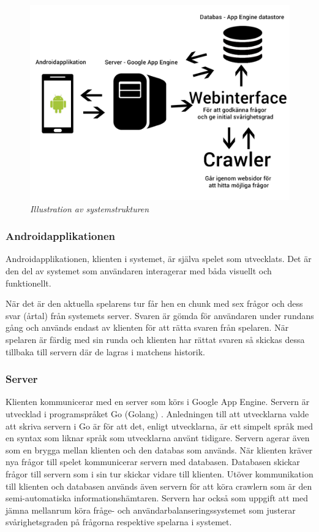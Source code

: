 \documentclass[a4paper, 11pt]{article}
\begin{document}
\begin{figure}[H]
	\begin{centering}
	\includegraphics[width = \textwidth]{systemstruktur.jpg} 
	\end{centering}
	\caption{\textit{Illustration av systemstrukturen}}
\end{figure} 

\subsubsection{Androidapplikationen}
Androidapplikationen, klienten i systemet, är själva spelet som utvecklats. Det är den del av systemet som användaren interagerar med båda visuellt och funktionellt.

När det är den aktuella spelarens tur får hen en chunk med sex frågor och dess svar (årtal) från systemets server. Svaren är gömda för användaren under rundans gång och används endast av klienten för att rätta svaren från spelaren. När spelaren är färdig med sin runda och klienten har rättat svaren så skickas dessa tillbaka till servern där de lagras i matchens historik. 

\subsubsection{Server}
Klienten kommunicerar med en server som körs i Google App Engine. Servern är utvecklad i programspråket Go (Golang) \cite{golang}. Anledningen till att utvecklarna valde att skriva servern i Go är för att det, enligt utvecklarna, är ett simpelt språk med en syntax som liknar språk som utvecklarna använt tidigare. Servern agerar även som en brygga mellan klienten och den databas som används. När klienten kräver nya frågor till spelet kommunicerar servern med databasen. Databasen skickar frågor till servern som i sin tur skickar vidare till klienten. Utöver kommunikation till klienten och databasen används även servern för att köra crawlern som är den semi-automatiska informationshämtaren. Servern har också som uppgift att med jämna mellanrum köra fråge- och användarbalanseringssystemet som justerar svårighetsgraden på frågorna respektive spelarna i systemet. 
\end{document}

